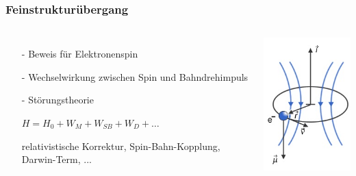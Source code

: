 \begin{frame}
  \frametitle{Feinstrukturübergang}
	\begin{columns}
		\begin{itemize}
		\item[-] Beweis für Elektronenspin
		\item[-] Wechselwirkung zwischen Spin und Bahndrehimpuls
		\item[-] Störungstheorie
		\item[]  $H = H_0+W_M + W_{SB} +W_D+ \dots$
		\item[]  relativistische Korrektur, Spin-Bahn-Kopplung, Darwin-Term, ...
		\end{itemize}
		
		
		\includegraphics[width = 4cm]{./pictures/feinstrukturelektron}
			
	\end{columns}
	
	
	
\end{frame}

